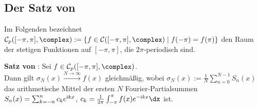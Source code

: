 \pagebreak

\subsection{%
    Der Satz von %
}

Im Folgenden bezeichnet
$\C_p([-\pi, \pi], \complex) :=
\{f \in \C([-\pi, \pi], \complex) \;|\; f(-\pi) = f(\pi)\}$
den Raum der stetigen Funktionen auf $[-\pi, \pi]$, die $2\pi$-periodisch sind.

\textbf{Satz von }:
Sei $f \in \C_p([-\pi, \pi], \complex)$.\\
Dann gilt $\sigma_N(x) \xrightarrow{N \to \infty} f(x)$ gleichmäßig,
wobei $\sigma_N(x) := \frac{1}{N} \sum_{n=0}^{N-1} S_n(x)$ das arithmetische
Mittel der ersten $N$ Fourier-Partialsummen
$S_n(x) = \sum_{k=-n}^n c_k e^{\mathrm{i} kx}$,
$c_k = \frac{1}{2\pi} \int_{-\pi}^\pi f(x) e^{-\i kx} \dx$ ist.

\linie

